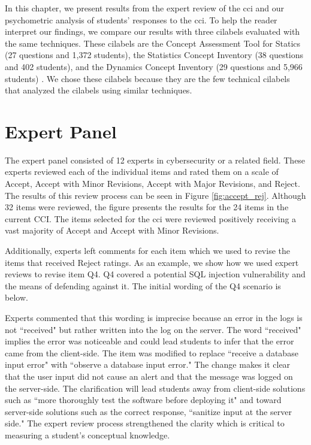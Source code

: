 In this chapter, we present results from the expert review of the \gls{cci} and our psychometric analysis of students' responses to the \gls{cci}. To help the reader interpret our findings, we compare our results with three \glspl{cilabel} evaluated with the same techniques. These \glspl{cilabel} are the Concept Assessment Tool for Statics (27 questions and 1,372 students), the Statistics Concept Inventory (38 questions and 402 students), and the Dynamics Concept Inventory (29 questions and 5,966 students) \cite{jorian}. We chose these \glspl{cilabel} because they are the few technical \glspl{cilabel} that analyzed the \glspl{cilabel} using similar techniques. 

\section{Expert Panel}


The expert panel consisted of 12 experts in cybersecurity or a related field. These experts reviewed each of the individual items and rated them on a scale of Accept, Accept with Minor Revisions, Accept with Major Revisions, and Reject. The results of this review process can be seen in Figure \ref{fig:accept_rej}. Although 32 items were reviewed, the figure presents the results for the 24 items in the current CCI. The items selected for the \gls{cci} were reviewed positively receiving a vast majority of Accept and Accept with Minor Revisions.

Additionally, experts left comments for each item which we used to revise the items that received Reject ratings. As an example, we show how we used expert reviews to revise item Q4. Q4 covered a potential SQL injection vulnerability and the means of defending against it. The initial wording of the Q4 scenario is below.

\begin{quotation}
\end{quotation}


Experts commented that this wording is imprecise because an error in the logs is not ``received" but rather written into the log on the server. The word ``received" implies the error was noticeable and could lead students to infer that the error came from the client-side. The item was modified to replace ``receive a database input error" with ``observe a database input error." The change makes it clear that the user input did not cause an alert and that the message was logged on the server-side. The clarification will lead students away from client-side solutions such as ``more thoroughly test the software before deploying it" and toward server-side solutions such as the correct response, ``sanitize input at the server side." The expert review process strengthened the clarity which is critical to measuring a student's conceptual knowledge.

